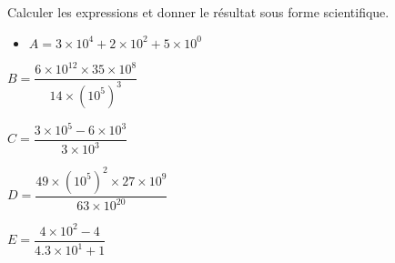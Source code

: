 \begin{exercice*}
    Calculer les expressions et donner le résultat sous forme scientifique.    
        \begin{itemize}
            \item[] $A = 3\times 10^4 + 2\times 10^2 + 5\times 10^0$
        \end{itemize}
        \begin{multicols}{2}            
            \begin{itemize}
                \begin{spacing}{2}
                \item[] $B=\dfrac{6\times 10^{12}\times 35 \times 10^8}{14\times \left(10^5\right)^3}$            
                \item[] $C=\dfrac{3\times 10^{5} - 6 \times 10^3}{3\times 10^3}$
                \item[] $D=\dfrac{49\times (10^{5})^2\times 27 \times 10^9}{63\times 10^{20}}$
                \item[] $E=\dfrac{4\times 10^{2} -4}{\num{4.3}\times 10^1 + 1}$
            \end{spacing}
            \end{itemize}
        \end{multicols}    
\end{exercice*}
